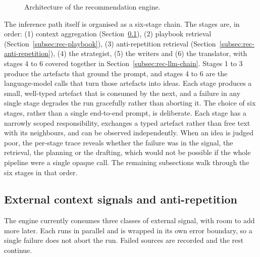 \begin{figure}[H]
{%
}
\caption{Architecture of the recommendation engine.}
\label{fig:rec-pipeline}
\end{figure}

The inference path itself is organised as a six-stage chain. The stages are, in order: (1) context aggregation (Section~\ref{subsec:rec-context}), (2) playbook retrieval (Section~\ref{subsec:rec-playbook}), (3) anti-repetition retrieval (Section~\ref{subsec:rec-anti-repetition}), (4) the strategist, (5) the writers and (6) the translator, with stages 4 to 6 covered together in Section~\ref{subsec:rec-llm-chain}. Stages 1 to 3 produce the artefacts that ground the prompt, and stages 4 to 6 are the language-model calls that turn those artefacts into ideas. Each stage produces a small, well-typed artefact that is consumed by the next, and a failure in any single stage degrades the run gracefully rather than aborting it. The choice of six stages, rather than a single end-to-end prompt, is deliberate. Each stage has a narrowly scoped responsibility, exchanges a typed artefact rather than free text with its neighbours, and can be observed independently. When an idea is judged poor, the per-stage trace reveals whether the failure was in the signal, the retrieval, the planning or the drafting, which would not be possible if the whole pipeline were a single opaque call. The remaining subsections walk through the six stages in that order.

\subsection{External context signals and anti-repetition}
\label{subsec:rec-context}
\label{subsec:rec-anti-repetition}

The engine currently consumes three classes of external signal, with room to add more later. Each runs in parallel and is wrapped in its own error boundary, so a single failure does not abort the run. Failed sources are recorded and the rest continue.

